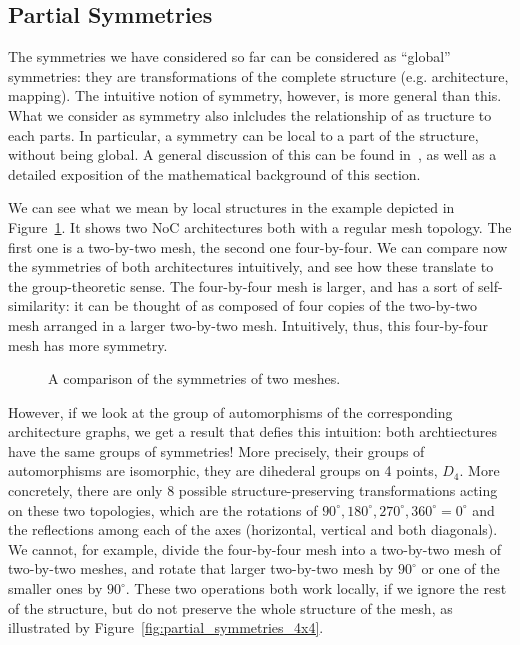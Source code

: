 \subsection{Partial Symmetries}

The symmetries we have considered so far can be considered as ``global'' symmetries: they are transformations of the complete structure (e.g. architecture, mapping).
The intuitive notion of symmetry, however, is more general than this. What we consider as symmetry also inlcludes the relationship of as tructure to each parts.
In particular, a symmetry can be local to a part of the structure, without being global. A general discussion of this can be found in~\cite{lawson_inverse_semigroups}, as well as a detailed exposition of the mathematical background of this section.

We can see what we mean by local structures in the example depicted in Figure~\ref{fig:motivation_partial_symmetries}.
It shows two \ac{NoC} architectures both with a regular mesh topology.
The first one is a two-by-two mesh, the second one four-by-four.
We can compare now the symmetries of both architectures intuitively, and see how these translate to the group-theoretic sense.
The four-by-four mesh is larger, and has a sort of self-similarity: it can be thought of as composed of four copies of the two-by-two mesh arranged in a larger two-by-two mesh.
Intuitively, thus, this four-by-four mesh has more symmetry.

\begin{figure}[h]
	\centering
   \resizebox{0.55\textwidth}{!}{}
	\caption{A comparison of the symmetries of two meshes.}
	\label{fig:motivation_partial_symmetries}
\end{figure}

However, if we look at the group of automorphisms of the corresponding architecture graphs, we get a result that defies this intuition:
both archtiectures have the same groups of symmetries!
More precisely, their groups of automorphisms are isomorphic, they are dihederal groups on 4 points, $D_4$.
More concretely, there are only 8  possible structure-preserving transformations acting on these two topologies, which are the rotations of $90^\circ,180^\circ,270^\circ,360^\circ = 0^\circ$ and the reflections among each of the axes (horizontal, vertical and both diagonals). We cannot, for example, divide the four-by-four mesh into a two-by-two mesh of two-by-two meshes, and rotate that larger two-by-two mesh by $90^\circ$ or one of the smaller ones by $90^\circ$. These two operations both work locally, if we ignore the rest of the structure, but do not preserve the whole structure of the mesh, as illustrated by Figure~\ref{fig:partial_symmetries_4x4}.

